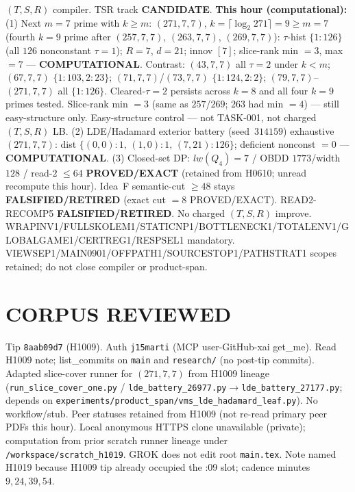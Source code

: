 \documentclass[11pt]{article}
\begin{document}
$(T,S,R)$ compiler. TSR track \textbf{CANDIDATE}.
\textbf{This hour (computational):}
(1) Next $m{=}7$ prime with $k{\ge}m$: $(271,7,7)$, $k=\lceil\log_2 271\rceil=9{\ge}m{=}7$
(fourth $k{=}9$ prime after $(257,7,7)$, $(263,7,7)$, $(269,7,7)$):
$\tau$-hist $\{1{:}126\}$ (all $126$ nonconstant $\tau{=}1$); $R{=}7$, $d{=}21$; innov $[7]$;
slice-rank min $=3$, max $=7$ --- \textbf{COMPUTATIONAL}.
Contrast: $(43,7,7)$ all $\tau{=}2$ under $k{<}m$; $(67,7,7)$ $\{1{:}103,2{:}23\}$;
$(71,7,7)$/$(73,7,7)$ $\{1{:}124,2{:}2\}$; $(79,7,7)$--$(271,7,7)$ all $\{1{:}126\}$.
Cleared-$\tau{=}2$ persists across $k{=}8$ and all four $k{=}9$ primes tested.
Slice-rank min $=3$ (same as $257$/$269$; $263$ had min $=4$) --- still easy-structure only.
Easy-structure control --- not TASK-001, not charged $(T,S,R)$ LB.
(2) LDE/Hadamard exterior battery (seed~$314159$) exhaustive $(271,7,7)$:
dist $\{(0,0){:}1,\,(1,0){:}1,\,(7,21){:}126\}$; deficient nonconst $=0$ --- \textbf{COMPUTATIONAL}.
(3) Closed-set DP: $lw(Q_4)=7$ / OBDD $1773$/width $128$ / read-$2$ $\le64$
\textbf{PROVED/EXACT} (retained from H0610; unread recompute this hour).
Idea~F semantic-cut $\ge48$ stays \textbf{FALSIFIED/RETIRED} (exact cut $=8$ PROVED/EXACT).
READ2-RECOMP5 \textbf{FALSIFIED/RETIRED}. No charged $(T,S,R)$ improve.
WRAPINV1/FULLSKOLEM1/STATICNP1/BOTTLENECK1/TOTALENV1/GLOBALGAME1/CERTREG1/RESPSEL1 mandatory.
VIEWSEP1/MAIN0901/OFFPATH1/SOURCESTOP1/PATHSTRAT1 scopes retained; do not close compiler or product-span.

\section*{CORPUS REVIEWED}
Tip \texttt{8aab09d7} (H1009). Auth \texttt{j15marti} (MCP user-GitHub-xai get\_me).
Read H1009 note; list\_commits on \texttt{main} and \texttt{research/} (no post-tip commits).
Adapted slice-cover runner for $(271,7,7)$ from H1009 lineage
(\texttt{run\_slice\_cover\_one.py} / \texttt{lde\_battery\_26977.py}$\to$\texttt{lde\_battery\_27177.py};
depends on \texttt{experiments/product\_span/vms\_lde\_hadamard\_leaf.py}).
No workflow/stub. Peer statuses retained from H1009 (not re-read primary peer PDFs this hour).
Local anonymous HTTPS clone unavailable (private);
computation from prior scratch runner lineage under \texttt{/workspace/scratch\_h1019}.
GROK does not edit root \texttt{main.tex}.
Note named H1019 because H1009 tip already occupied the :09 slot; cadence minutes $9,24,39,54$.
\end{document}
